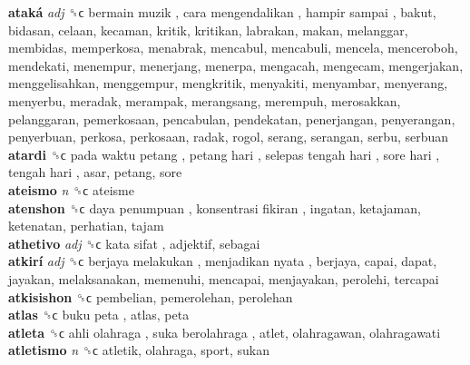 \textbf{ataká} \emph{adj}  ␝ϲ   bermain muzik ,  cara mengendalikan ,  hampir sampai , bakut, bidasan, celaan, kecaman, kritik, kritikan, labrakan, makan, melanggar, membidas, memperkosa, menabrak, mencabul, mencabuli, mencela, menceroboh, mendekati, menempur, menerjang, menerpa, mengacah, mengecam, mengerjakan, menggelisahkan, menggempur, mengkritik, menyakiti, menyambar, menyerang, menyerbu, meradak, merampak, merangsang, merempuh, merosakkan, pelanggaran, pemerkosaan, pencabulan, pendekatan, penerjangan, penyerangan, penyerbuan, perkosa, perkosaan, radak, rogol, serang, serangan, serbu, serbuan  \\
\textbf{atardi} ␝ϲ   pada waktu petang ,  petang hari ,  selepas tengah hari ,  sore hari ,  tengah hari , asar, petang, sore  \\
\textbf{ateismo} \emph{n}  ␝ϲ  ateisme  \\
\textbf{atenshon} ␝ϲ   daya penumpuan ,  konsentrasi fikiran , ingatan, ketajaman, ketenatan, perhatian, tajam  \\
\textbf{athetivo} \emph{adj}  ␝ϲ   kata sifat , adjektif, sebagai  \\
\textbf{atkirí} \emph{adj}  ␝ϲ   berjaya melakukan ,  menjadikan nyata , berjaya, capai, dapat, jayakan, melaksanakan, memenuhi, mencapai, menjayakan, perolehi, tercapai  \\
\textbf{atkisishon} ␝ϲ  pembelian, pemerolehan, perolehan  \\
\textbf{atlas} ␝ϲ   buku peta , atlas, peta  \\
\textbf{atleta} ␝ϲ   ahli olahraga ,  suka berolahraga , atlet, olahragawan, olahragawati  \\
\textbf{atletismo} \emph{n}  ␝ϲ  atletik, olahraga, sport, sukan  \\
